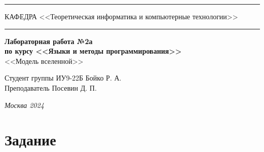 \documentclass[a4paper, 14pt]{extarticle}
\begin{document}
\begin{titlepage}
    \vspace*{-16pt}
    \hspace{47pt}\rule{0.83\textwidth}{0.4pt}

    \vspace{0.5ex}
    \hspace{-35pt} \noindent \small КАФЕДРА\hspace{50pt} <<Теоретическая информатика и компьютерные технологии>>

    \vspace*{-16pt}
    \hspace{30pt}\rule{0.866\textwidth}{0.4pt}

    \vspace{11em}

    \begin{center}
        \Large {\bf Лабораторная работа №2а} \\
        \large {\bf по курсу <<Языки и методы программирования>>} \\
        \large <<Модель вселенной>>
    \end{center}\normalsize

    \vspace{8em}


    \begin{flushright}
        {Студент группы ИУ9-22Б Бойко Р. А. \hspace*{15pt}\\
            \vspace{2ex}
            Преподаватель Посевин Д. П.\hspace*{15pt}}
    \end{flushright}

    \bigskip

    \vfill


    \begin{center}
        \textsl{Москва 2024}
    \end{center}
\end{titlepage}

\renewcommand{\ttdefault}{pcr}

\setlength{\tabcolsep}{3pt}
\newpage
\setcounter{page}{2}

\section{Задание}\label{Sect::task}
\end{document}

